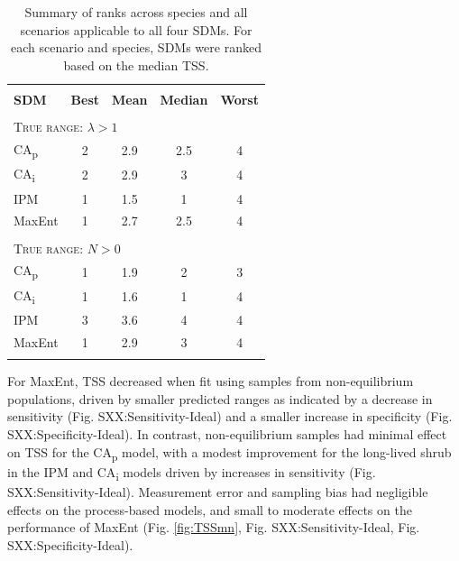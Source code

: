 \documentclass[preprint,review,times,12pt]{elsarticle}
\begin{document}
\begin{table}
	\centering
	\captionsetup{width=.75\textwidth}
	\begin{tabular}{l c c c c}
		\hline \\[-3.5ex]
		\textbf{SDM} & \textbf{Best} & \textbf{Mean} & \textbf{Median} & \textbf{Worst}\\
		\hline 
		\hline \\[-2.5ex]
		\multicolumn{5}{l}{\textsc{True range: $\lambda > 1$}} \\
		CA\textsubscript{p} & 2 & 2.9 & 2.5 & 4\\
		CA\textsubscript{i} & 2 & 2.9 & 3 & 4\\
		IPM & 1 & 1.5 & 1 & 4\\
		MaxEnt & 1 & 2.7 & 2.5 & 4\\
		[.5ex]\hline \\[-2.5ex]
		\multicolumn{5}{l}{\textsc{True range: $N > 0$}} \\
		CA\textsubscript{p} & 1 & 1.9 & 2 & 3\\
		CA\textsubscript{i} & 1 & 1.6 & 1 & 4\\
		IPM & 3 & 3.6 & 4 & 4\\
		MaxEnt & 1 & 2.9 & 3 & 4\\
		[.5ex]\hline \\[-2ex]
	\end{tabular}
	\caption{\label{table:ranks}Summary of ranks across species and all scenarios applicable to all four SDMs. For each scenario and species, SDMs were ranked based on the median TSS.}
\end{table}

For MaxEnt, TSS decreased when fit using samples from non-equilibrium populations, driven by smaller predicted ranges as indicated by a decrease in sensitivity (Fig. SXX:Sensitivity-Ideal) and a smaller increase in specificity (Fig. SXX:Specificity-Ideal). In contrast, non-equilibrium samples had minimal effect on TSS for the CA\textsubscript{p} model, with a modest improvement for the long-lived shrub in the IPM and CA\textsubscript{i} models driven by increases in sensitivity (Fig. SXX:Sensitivity-Ideal). Measurement error and sampling bias had negligible effects on the process-based models, and small to moderate effects on the performance of MaxEnt (Fig. \ref{fig:TSSmn}, Fig. SXX:Sensitivity-Ideal, Fig. SXX:Specificity-Ideal). 
\end{document}
